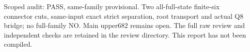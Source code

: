\documentclass{article}
\begin{document}
Scoped audit: PASS, same-family provisional. Two all-full-state finite-six connector cuts, same-input exact strict separation, root transport and actual Q8 bridge; no full-family NO. Main upper682 remains open. The full raw review and independent checks are retained in the review directory. This report has not been compiled.
\end{document}

